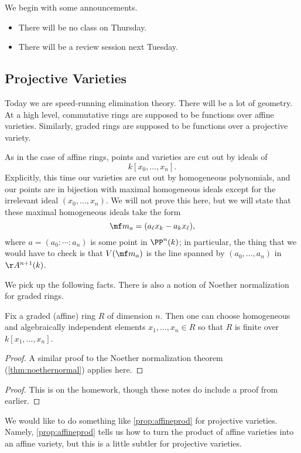 \documentclass[../notes.tex]{subfiles}
\begin{document}

We begin with some announcements.
\begin{itemize}
	\item There will be no class on Thursday.
	\item There will be a review session next Tuesday.
\end{itemize}

\subsection{Projective Varieties}
Today we are speed-running elimination theory. There will be a lot of geometry. At a high level, commutative rings are supposed to be functions over affine varieties. Similarly, graded rings are supposed to be functions over a projective variety.

As in the case of affine rings, points and varieties are cut out by ideals of
\[k[x_0,\ldots,x_n].\]
Explicitly, this time our varieties are cut out by homogeneous polynomials, and our points are in bijection with maximal homogeneous ideals except for the irrelevant ideal $(x_0,\ldots,x_n)$. We will not prove this here, but we will state that these maximal homogeneous ideals take the form
\[\mf m_a=(a_\ell x_k-a_kx_\ell),\]
where $a=(a_0:\cdots:a_n)$ is some point in $\PP^n(k)$; in particular, the thing that we would have to check is that $V(\mf m_a)$ is the line spanned by $(a_0,\ldots,a_n)$ in $\AA^{n+1}(k)$.

We pick up the following facts.
\gradedassociatedprimeprop*
\noindent There is also a notion of Noether normalization for graded rings.
\begin{proposition}
	Fix a graded (affine) ring $R$ of dimension $n$. Then one can choose homogeneous and algebraically independent elements $x_1,\ldots,x_n\in R$ so that $R$ is finite over $k[x_1,\ldots,x_n]$.
\end{proposition}
\begin{proof}
	A similar proof to the Noether normalization theorem (\autoref{thm:noethernormal}) applies here.
\end{proof}
\productofaffinesprop*
\begin{proof}
	This is on the homework, though these notes do include a proof from earlier.
\end{proof}
We would like to do something like \autoref{prop:affineprod} for projective varieties. Namely, \autoref{prop:affineprod} tells us how to turn the product of affine varieties into an affine variety, but this is a little subtler for projective varieties.
\end{document}
